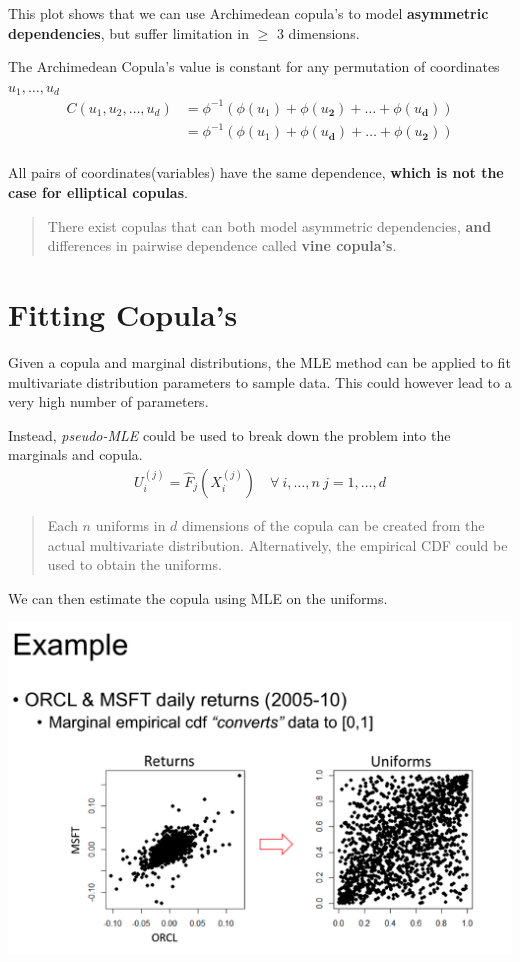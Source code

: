 \documentclass[
  oneside]{book}
\begin{document}
This plot shows that we can use Archimedean copula's to model \textbf{asymmetric dependencies}, but suffer limitation in \(\geq\) 3 dimensions.

The Archimedean Copula's value is constant for any permutation of coordinates \(u_{1}, \dots, u_{d}\)
\[
\begin{aligned}
C(u_{1}, u_{2}, \dots, u_{d}) &= \phi ^{-1}(\phi(u_{1})+\phi(u_{\mathbf{2}})+\dots+\phi(u_{\mathbf{d}}))\\
&= \phi ^{-1}(\phi(u_{1})+\phi(u_{\mathbf{d}})+\dots+\phi(u_{\mathbf{2}}))\\
\end{aligned}
\]

All pairs of coordinates(variables) have the same dependence, \textbf{which is not the case for elliptical copulas}.

\begin{quote}
There exist copulas that can both model asymmetric dependencies, \textbf{and} differences in pairwise dependence called \textbf{vine copula's}.
\end{quote}

\hypertarget{fitting-copulas}{%
\section{Fitting Copula's}\label{fitting-copulas}}

Given a copula and marginal distributions, the MLE method can be applied to fit multivariate distribution parameters to sample data. This could however lead to a very high number of parameters.

Instead, \emph{pseudo-MLE} could be used to break down the problem into the marginals and copula.
\[
\begin{aligned}
U_{i}^{(j)} = \hat{F}_{j}(X_{i}^{(j)}) \quad \forall \ i, \dots,n \ j = 1, \dots, d
\end{aligned}
\]

\begin{quote}
Each \(n\) uniforms in \(d\) dimensions of the copula can be created from the actual multivariate distribution. Alternatively, the empirical CDF could be used to obtain the uniforms.
\end{quote}

We can then estimate the copula using MLE on the uniforms.

\includegraphics{Notes/Obsidian-Attachments/4-Multivariate-Return-Modelling-14.png}
\end{document}
